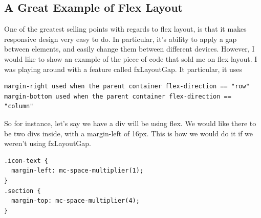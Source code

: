 \subsection{ A Great Example of Flex Layout }

One of the greatest selling points with regards to flex layout, is that it makes
responsive design very easy to do. In particular, it's ability to apply a gap
between elements, and easily change them between different devices. However, I
would like to show an example of the piece of code that sold me on flex layout.
I was playing around with a feature called fxLayoutGap. It particular, it uses
\begin{verbatim}
margin-right used when the parent container flex-direction == "row"
margin-bottom used when the parent container flex-direction == "column"
\end{verbatim}

So for instance, let's say we have a div will be using flex. We would like
there to be two divs inside, with a margin-left of 16px. This is how we would
do it if we weren't using fxLayoutGap.
\begin{lstlisting}
.icon-text {
  margin-left: mc-space-multiplier(1);
}
.section {
  margin-top: mc-space-multiplier(4);
}
\end{lstlisting}


